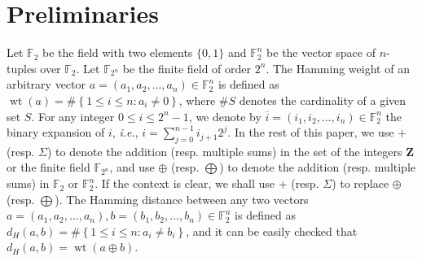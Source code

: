 \documentclass{article}
\newcommand{\Z}{\mathbf{Z}}
\newcommand{\F}{\mathbb{F}}
\newcommand{\0}{\textbf{0}}
\newcommand{\1}{\textbf{1}}
\newcommand{\wt}{\operatorname{wt}}
\theoremstyle{plain}
\begin{document}
\section{Preliminaries}
    Let $\F_2$ be the field with two elements $\{0,1\}$ and $\F_2^n$ be the vector space of $n$-tuples over $\F_2$.
    Let $\F_{2^n}$ be the finite field of order $2^n$.
    The Hamming weight of an arbitrary vector $a=(a_1,a_2,\dots,a_n)\in\F_2^n$ is defined as $\wt(a)=\#\left\{ 1\le i\le n:a_i\ne 0 \right\}$, where $\#S$ denotes the cardinality of a given set $S$.
    For any integer $0\le i \le 2^n-1$, we denote by $\overline{i}=(i_1,i_2,\dots,i_n)\in\F_2^n$ the binary expansion of $i$, \emph{i.e.}, $i=\sum_{j=0}^{n-1}i_{j+1}2^j$.
    In the rest of this paper, we use $+$ (resp. $\Sigma$) to denote the addition (resp. multiple sums) in the set of the integers $\Z$ or the finite field $\F_{2^n}$, and use $\oplus$ (resp. $\bigoplus$) to denote the addition (resp. multiple sums) in $\F_2$ or $\F_2^n$.
    If the context is clear, we shall use $+$ (resp. $\Sigma$) to replace $\oplus$ (resp. $\bigoplus$).
    The Hamming distance between any two vectors $a=(a_1,a_2,\dots,a_n),b=(b_1,b_2,\dots,b_n)\in\F_2^n$ is defined as $d_H(a,b)=\#\left\{ 1\le i\le n : a_i\ne b_i \right\}$, and it can be easily checked that $d_H(a,b)=\wt(a\oplus b)$.
\end{document}
